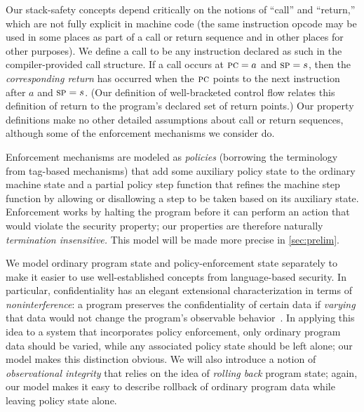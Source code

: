 \documentclass[acmsmall,review,anonymous]{acmart}\settopmatter{printfolios=true,printccs=false,printacmref=false}
\begin{document}
Our stack-safety concepts depend critically on the notions of ``call'' and ``return,''
which are not fully explicit in machine code (the same instruction opcode may be
used in some places as part of a call or return sequence and in other places
for other purposes).  We define a call to be
any instruction declared as such in the compiler-provided call structure.
If a call occurs at $\textsc{pc} = a$ and $\textsc{sp} = s$, then the \emph{corresponding
  return} has occurred when the $\textsc{pc}$ points to the next instruction after $a$ and $\textsc{sp} = s$. (Our definition
of well-bracketed control flow relates this definition of return to the program's
declared set of return points.)
Our property definitions make no other detailed assumptions about call or return sequences, although
some of the enforcement mechanisms we consider do.

Enforcement mechanisms are modeled as {\em policies} (borrowing the
terminology from tag-based mechanisms) that add some auxiliary policy
state to the ordinary machine state
and a partial policy step function that refines the machine step
function by allowing or disallowing a step to be taken based on its
auxiliary state.  Enforcement works by halting the program before it
can perform an action that would violate the security property; our
properties are therefore naturally \emph{termination insensitive.}
This model will be made more precise in \cref{sec:prelim}.

We model ordinary program state and policy-enforcement state separately to make it
easier to use well-established concepts from language-based security.
In particular, confidentiality has an elegant extensional characterization in terms of
\emph{noninterference}: a program preserves the confidentiality of certain data if
\emph{varying} that data would not change the program's observable
behavior~\citep{6234468}.
In applying this idea to a system that incorporates policy enforcement, only
ordinary program data should be varied, while any associated policy
state should be left alone; our model makes this distinction obvious.
We will also introduce a notion of {\em observational integrity} that relies on the idea of
\emph{rolling back} program state; again, our model makes it easy to describe
rollback of ordinary program data while leaving policy state alone.
\end{document}
